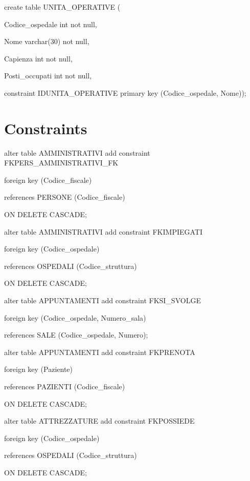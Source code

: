 \documentclass[a4paper,12pt]{report}
\begin{document}
\noindent create table UNITA\_OPERATIVE (

     Codice\_ospedale int not null,

     Nome varchar(30) not null,

     Capienza int not null,

     Posti\_occupati int not null,

     constraint IDUNITA\_OPERATIVE primary key (Codice\_ospedale, Nome)); \newline

\section{Constraints}

\noindent alter table AMMINISTRATIVI add constraint FKPERS\_AMMINISTRATIVI\_FK

     foreign key (Codice\_fiscale)

     references PERSONE (Codice\_fiscale)

     ON DELETE CASCADE; \newline

\noindent alter table AMMINISTRATIVI add constraint FKIMPIEGATI

     foreign key (Codice\_ospedale)

     references OSPEDALI (Codice\_struttura)

     ON DELETE CASCADE; \newline

\noindent alter table APPUNTAMENTI add constraint FKSI\_SVOLGE

     foreign key (Codice\_ospedale, Numero\_sala)

     references SALE (Codice\_ospedale, Numero); \newline

\noindent alter table APPUNTAMENTI add constraint FKPRENOTA

     foreign key (Paziente)

     references PAZIENTI (Codice\_fiscale)

     ON DELETE CASCADE; \newline

\noindent alter table ATTREZZATURE add constraint FKPOSSIEDE

     foreign key (Codice\_ospedale)

     references OSPEDALI (Codice\_struttura)

     ON DELETE CASCADE; \newline
\end{document}
